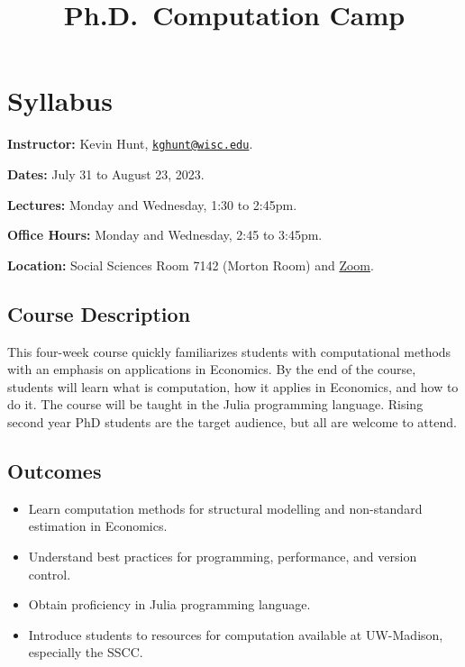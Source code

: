 \documentclass[
]{book}
\title{Ph.D.~Computation Camp}
\author{}
\date{\vspace{-2.5em}}
\providecommand{\tightlist}{%
  \setlength{\itemsep}{0pt}\setlength{\parskip}{0pt}}
\begin{document}
\maketitle

{
\setcounter{tocdepth}{1}
\tableofcontents
}
\hypertarget{syllabus}{%
\chapter{Syllabus}\label{syllabus}}

\textbf{Instructor:} Kevin Hunt, \href{mailto:kghunt@wisc.edu}{\nolinkurl{kghunt@wisc.edu}}.

\textbf{Dates:} July 31 to August 23, 2023.

\textbf{Lectures:} Monday and Wednesday, 1:30 to 2:45pm.

\textbf{Office Hours:} Monday and Wednesday, 2:45 to 3:45pm.

\textbf{Location:} Social Sciences Room 7142 (Morton Room) and \href{https://uwmadison.zoom.us/j/93415370734?pwd=V1l1TmdmV2lYYUNkTk5rQmdiZU9Wdz09}{Zoom}.

\hypertarget{course-description}{%
\section{Course Description}\label{course-description}}

This four-week course quickly familiarizes students with computational methods with an emphasis on applications in Economics. By the end of the course, students will learn what is computation, how it applies in Economics, and how to do it. The course will be taught in the Julia programming language. Rising second year PhD students are the target audience, but all are welcome to attend.

\hypertarget{outcomes}{%
\section{Outcomes}\label{outcomes}}

\begin{itemize}
\tightlist
\item
  Learn computation methods for structural modelling and non-standard estimation in Economics.
\item
  Understand best practices for programming, performance, and version control.
\item
  Obtain proficiency in Julia programming language.
\item
  Introduce students to resources for computation available at UW-Madison, especially the SSCC.
\end{itemize}
\end{document}

